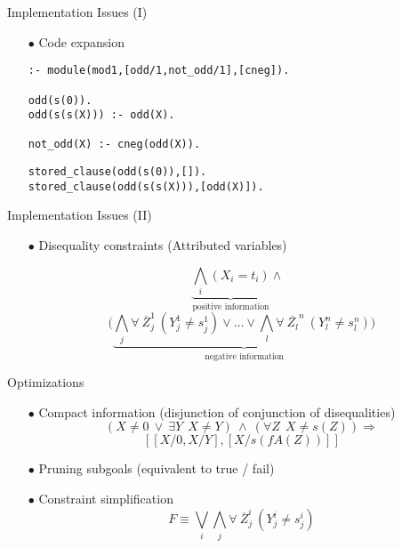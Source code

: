 \documentclass[pdf,slideColor,contemporain]{prosper}
\begin{document}

\begin{slide}{Implementation Issues (I)}
     \begin{itemize}
        \item[$\bullet$] {\blue Code expansion}
\begin{small}
\begin{verbatim}
:- module(mod1,[odd/1,not_odd/1],[cneg]).

odd(s(0)).
odd(s(s(X))) :- odd(X).

not_odd(X) :- cneg(odd(X)).
\end{verbatim}
{\blue
\begin{verbatim}
stored_clause(odd(s(0)),[]).
stored_clause(odd(s(s(X))),[odd(X)]).

\end{verbatim}}
\end{small}
     \end{itemize}
\end{slide}

\begin{slide}{Implementation Issues (II)}
     \begin{itemize}

        \item[$\bullet$] {\blue Disequality constraints} (Attributed variables) \\
\begin{small}

\[ \underbrace{\bigwedge_i (X_i = t_i)}_{\mbox{positive information}} \wedge~~~\] 
\[(
\underbrace{\bigwedge_j \forall~ \overline{Z}_j^1~(Y_j^1 \neq s_j^1)
\vee \ldots \vee \bigwedge_l \forall~ \overline{Z_l}^n~(Y_l^n
\neq s_l^n) )}_{\mbox{negative information}} \]


\end{small}

     \end{itemize}
\end{slide}
\begin{slide}{Optimizations}
     \begin{itemize}

        \item[$\bullet$] {\blue Compact information} (disjunction of conjunction of disequalities) 
\vspace{-0.2cm}
\[ (X \neq 0 ~\vee~ \exists Y ~~ X \neq Y) ~\wedge~ (\forall Z ~~ X \neq s(Z)) \Rightarrow \]
\[ [[X/0, X/Y],[X/s(fA(Z))]] \]
        \item[$\bullet$] {\blue Pruning subgoals} (equivalent to true / fail) 
        \item[$\bullet$] {\blue Constraint simplification}
\[ F \equiv  \bigvee_i\bigwedge_j \forall~ \overline{Z}_j^i~(Y_j^i \neq s_j^i) \]

     \end{itemize}
\end{slide}
\end{document}
